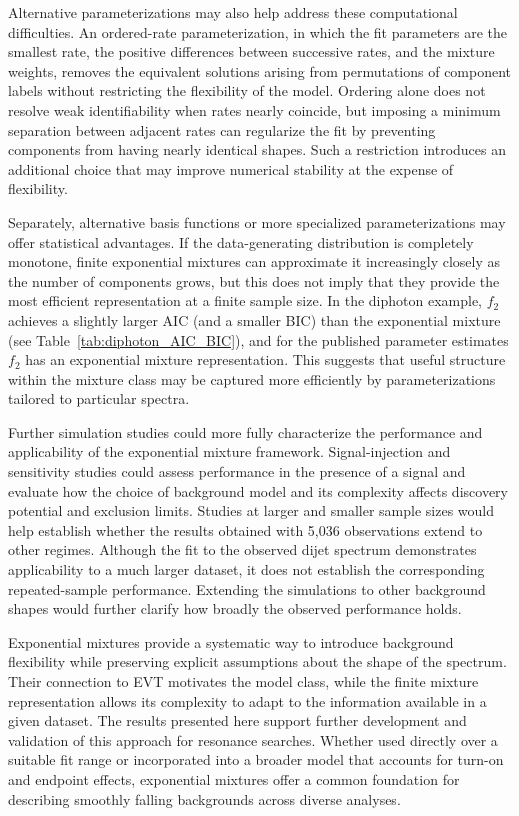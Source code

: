 \documentclass[a4paper,11pt]{article}
\begin{document}
Alternative parameterizations may also help address these computational difficulties. An ordered-rate parameterization, in which the fit parameters are the smallest rate, the positive differences between successive rates, and the mixture weights, removes the equivalent solutions arising from permutations of component labels without restricting the flexibility of the model. Ordering alone does not resolve weak identifiability when rates nearly coincide, but imposing a minimum separation between adjacent rates can regularize the fit by preventing components from having nearly identical shapes. Such a restriction introduces an additional choice that may improve numerical stability at the expense of flexibility.

Separately, alternative basis functions or more specialized parameterizations may offer statistical advantages. If the data-generating distribution is completely monotone, finite exponential mixtures can approximate it increasingly closely as the number of components grows, but this does not imply that they provide the most efficient representation at a finite sample size. In the diphoton example, $f_2$ achieves a slightly larger AIC (and a smaller BIC) than the exponential mixture (see Table~\ref{tab:diphoton_AIC_BIC}), and for the published parameter estimates $f_2$ has an exponential mixture representation. This suggests that useful structure within the mixture class may be captured more efficiently by parameterizations tailored to particular spectra.

Further simulation studies could more fully characterize the performance and applicability of the exponential mixture framework. Signal-injection and sensitivity studies could assess performance in the presence of a signal and evaluate how the choice of background model and its complexity affects discovery potential and exclusion limits. Studies at larger and smaller sample sizes would help establish whether the results obtained with 5,036 observations extend to other regimes. Although the fit to the observed dijet spectrum demonstrates applicability to a much larger dataset, it does not establish the corresponding repeated-sample performance. Extending the simulations to other background shapes would further clarify how broadly the observed performance holds.

Exponential mixtures provide a systematic way to introduce background flexibility while preserving explicit assumptions about the shape of the spectrum. Their connection to EVT motivates the model class, while the finite mixture representation allows its complexity to adapt to the information available in a given dataset. The results presented here support further development and validation of this approach for resonance searches. Whether used directly over a suitable fit range or incorporated into a broader model that accounts for turn-on and endpoint effects, exponential mixtures offer a common foundation for describing smoothly falling backgrounds across diverse analyses.
\end{document}
